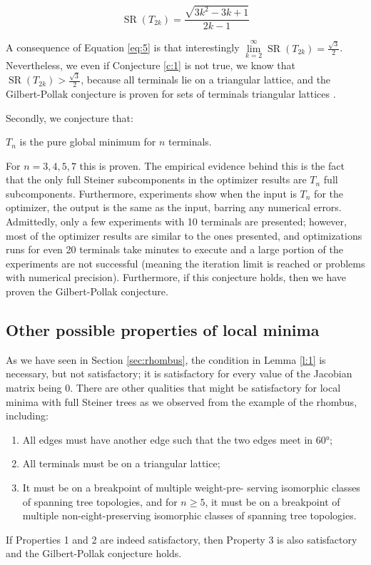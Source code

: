 \documentclass{mpaper}
\begin{document}
\begin{equation} \label{eq:5}
  \operatorname{SR}(T_{2k}) = \frac{\sqrt{3k^2 -3k + 1}}{2 k - 1}
\end{equation}

A consequence of Equation \ref{eq:5} is that interestingly $\allowbreak\lim\limits_{k=2}^\infty \allowbreak\operatorname{SR}(T_{2k})=\frac{\sqrt{3}}{2}$. Nevertheless, we even if Conjecture \ref{c:1} is not true, we know that $\operatorname{SR}(T_{2k})>\frac{\sqrt{3}}{2}$, because all terminals lie on a triangular lattice, and the Gilbert-Pollak conjecture is proven for sets of terminals triangular lattices \cite{po}.

Secondly, we conjecture that:

\begin{conjecture}\label{c:2}
  $T_n$ is the pure global minimum for $n$ terminals.
\end{conjecture}

For $n=3,4,5,7$ this is proven. The empirical evidence behind this is the fact that the only full Steiner subcomponents in the optimizer results are $T_n$ full subcomponents. Furthermore, experiments show when the input is $T_n$ for the optimizer, the output is the same as the input, barring any numerical errors. Admittedly, only a few experiments with 10 terminals are presented; however, most of the optimizer results are similar to the ones presented, and optimizations runs for even 20 terminals take minutes to execute and a large portion of the experiments are not successful (meaning the iteration limit is reached or problems with numerical precision). Furthermore, if this conjecture holds, then we have proven the Gilbert-Pollak conjecture.

\subsection{Other possible properties of local minima}
As we have seen in Section \ref{sec:rhombus}, the condition in Lemma \ref{l:1} is necessary, but not satisfactory; it is satisfactory for every value of the Jacobian matrix being 0. There are other qualities that might be satisfactory for local minima with full Steiner trees as we observed from the example of the rhombus, including:
\begin{enumerate}
  \item All edges must have another edge such that the two edges meet in 60°;
  \item All terminals must be on a triangular lattice;
  \item It must be on a breakpoint of multiple weight-pre- serving isomorphic classes of spanning tree topologies, and for $n\geq5$, it must be on a breakpoint of multiple non-eight-preserving isomorphic classes of spanning tree topologies.
\end{enumerate}
If Properties 1 and 2 are indeed satisfactory, then Property 3 is also satisfactory and the Gilbert-Pollak conjecture holds.
\end{document}
